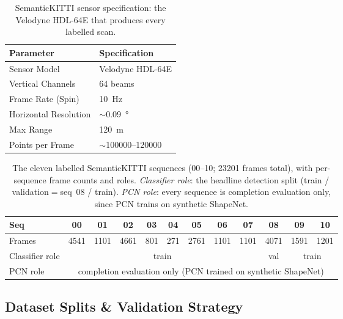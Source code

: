\begin{table}[H]
  \centering
  \caption[SemanticKITTI sensor specification]{SemanticKITTI sensor specification: the
    Velodyne HDL-64E that produces every labelled scan.}
  \label{tab:sensor-spec}
  \begin{tabular}{@{}ll@{}}
    \toprule
    Parameter & Specification \\
    \midrule
    Sensor Model          & Velodyne HDL-64E \\
    Vertical Channels     & \num{64} beams \\
    Frame Rate (Spin)     & \SI{10}{\hertz} \\
    Horizontal Resolution & $\sim$\SI{0.09}{\degree} \\
    Max Range             & \SI{120}{\meter} \\
    Points per Frame      & $\sim$\numrange{100000}{120000} \\
    \bottomrule
  \end{tabular}
\end{table}

\begin{table}[H]
  \centering
  \caption[Labelled SemanticKITTI sequences and their roles]{The eleven labelled
    SemanticKITTI sequences (00--10; \num{23201} frames total), with per-sequence
    frame counts and roles. \emph{Classifier role}: the headline detection split (train /
    validation${}={}$seq~08 / train). \emph{PCN role}: every sequence is completion evaluation
    only, since PCN trains on synthetic ShapeNet.}
  \label{tab:dataset}
  \small
  \setlength{\tabcolsep}{5pt}
  \begin{tabular}{lccccccccccc}
    \toprule
    Seq & 00 & 01 & 02 & 03 & 04 & 05 & 06 & 07 & \multicolumn{1}{|c|}{08} & 09 & 10 \\
    \midrule
    Frames & 4541 & 1101 & 4661 & 801 & 271 & 2761 & 1101 & 1101 & \multicolumn{1}{|c|}{4071} & 1591 & 1201 \\
    Classifier role & \multicolumn{8}{c}{train} & \multicolumn{1}{|c|}{val} & \multicolumn{2}{c}{train} \\
    PCN role & \multicolumn{11}{c}{completion evaluation only (PCN trained on synthetic ShapeNet)} \\
    \bottomrule
  \end{tabular}
\end{table}

\subsection{Dataset Splits \& Validation Strategy}

